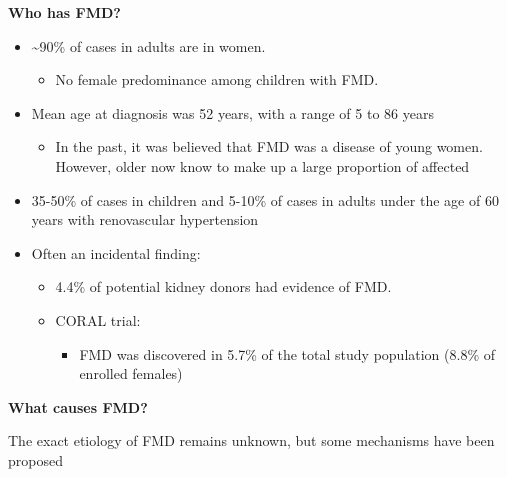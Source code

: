 \documentclass[
]{book}
\providecommand{\tightlist}{%
  \setlength{\itemsep}{0pt}\setlength{\parskip}{0pt}}
\begin{document}
\textbf{Who has FMD?}

\begin{itemize}
\item
  \textasciitilde90\% of cases in adults are in women.

  \begin{itemize}
  \tightlist
  \item
    No female predominance among children with FMD.
  \end{itemize}
\item
  Mean age at diagnosis was 52 years, with a range of 5 to 86 years

  \begin{itemize}
  \tightlist
  \item
    In the past, it was believed that FMD was a disease of young
    women. However, older now know to make up a large proportion of
    affected
  \end{itemize}
\item
  35-50\% of cases in children and 5-10\% of cases in adults under the
  age of 60 years with renovascular hypertension
\item
  Often an incidental finding:

  \begin{itemize}
  \item
    4.4\% of potential kidney donors had evidence of FMD.
  \item
    CORAL trial:

    \begin{itemize}
    \tightlist
    \item
      FMD was discovered in 5.7\% of the total study population
      (8.8\% of enrolled females)
    \end{itemize}
  \end{itemize}
\end{itemize}

\textbf{What causes FMD?}

The exact etiology of FMD remains unknown, but some mechanisms have been
proposed
\end{document}
